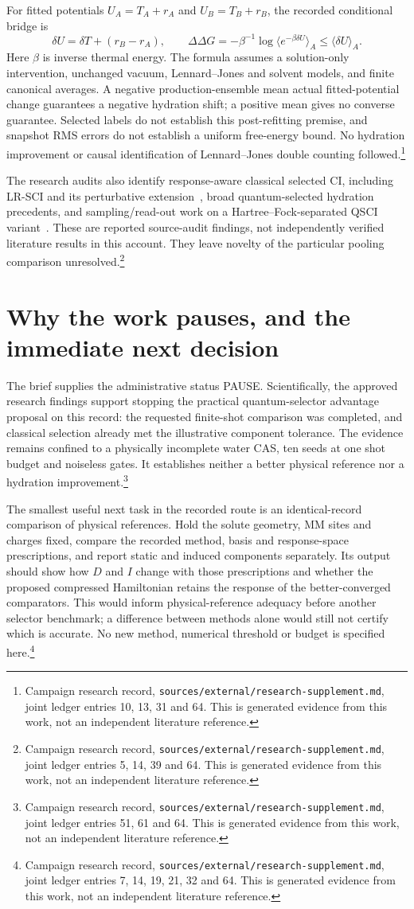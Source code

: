 \documentclass{article}
\newcommand{\record}[1]{\footnote{Campaign research record, \texttt{sources/external/research-supplement.md}, #1. This is generated evidence from this work, not an independent literature reference.}}
\begin{document}
For fitted potentials \(U_A=T_A+r_A\) and \(U_B=T_B+r_B\), the recorded conditional bridge is
\[
 \delta U=\delta T+(r_B-r_A),\qquad
 \Delta\Delta G=-\beta^{-1}\log\langle e^{-\beta\delta U}\rangle_A
 \leq\langle\delta U\rangle_A.
\]
Here \(\beta\) is inverse thermal energy. The formula assumes a solution-only intervention, unchanged vacuum, Lennard--Jones and solvent models, and finite canonical averages. A negative production-ensemble mean actual fitted-potential change guarantees a negative hydration shift; a positive mean gives no converse guarantee. Selected labels do not establish this post-refitting premise, and snapshot RMS errors do not establish a uniform free-energy bound. No hydration improvement or causal identification of Lennard--Jones double counting followed.\record{joint ledger entries 10, 13, 31 and 64}

The research audits also identify response-aware classical selected CI, including LR-SCI and its perturbative extension~\cite{LR,LRPT}, broad quantum-selected hydration precedents, and sampling/read-out work on a Hartree--Fock-separated QSCI variant~\cite{readout}. These are reported source-audit findings, not independently verified literature results in this account. They leave novelty of the particular pooling comparison unresolved.\record{joint ledger entries 5, 14, 39 and 64}

\section{Why the work pauses, and the immediate next decision}
The brief supplies the administrative status PAUSE. Scientifically, the approved research findings support stopping the practical quantum-selector advantage proposal on this record: the requested finite-shot comparison was completed, and classical selection already met the illustrative component tolerance. The evidence remains confined to a physically incomplete water CAS, ten seeds at one shot budget and noiseless gates. It establishes neither a better physical reference nor a hydration improvement.\record{joint ledger entries 51, 61 and 64}

The smallest useful next task in the recorded route is an identical-record comparison of physical references. Hold the solute geometry, MM sites and charges fixed, compare the recorded method, basis and response-space prescriptions, and report static and induced components separately. Its output should show how \(D\) and \(I\) change with those prescriptions and whether the proposed compressed Hamiltonian retains the response of the better-converged comparators. This would inform physical-reference adequacy before another selector benchmark; a difference between methods alone would still not certify which is accurate. No new method, numerical threshold or budget is specified here.\record{joint ledger entries 7, 14, 19, 21, 32 and 64}
\end{document}
